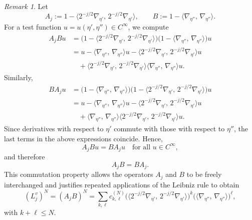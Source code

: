 \documentclass[12pt, reqno]{amsart}
\theoremstyle{definition}
\theoremstyle{remark}
\newtheorem{remark}[theorem]{Remark}
\numberwithin{equation}{section}
\begin{document}
\begin{remark}
Let
\[
A_j := 1 - \langle 2^{-j/2}\nabla_{\eta'},\,2^{-j/2}\nabla_{\eta'}\rangle,
\qquad
B := 1 - \langle\nabla_{\eta''},\,\nabla_{\eta''}\rangle .
\]
For a test function $u=u(\eta',\eta'')\in C^\infty$, we compute
\begin{align*}
A_j B u
&=
\Big(1 - \langle 2^{-j/2}\nabla_{\eta'},\,2^{-j/2}\nabla_{\eta'}\rangle\Big)
\Big(1 - \langle\nabla_{\eta''},\,\nabla_{\eta''}\rangle\Big)u \\
&=
u
- \langle\nabla_{\eta''},\,\nabla_{\eta''}\rangle u
- \langle 2^{-j/2}\nabla_{\eta'},\,2^{-j/2}\nabla_{\eta'}\rangle u \\
&\quad
+ \langle 2^{-j/2}\nabla_{\eta'},\,2^{-j/2}\nabla_{\eta'}\rangle
\langle\nabla_{\eta''},\,\nabla_{\eta''}\rangle u .
\end{align*}
Similarly,
\begin{align*}
B A_j u
&=
\Big(1 - \langle\nabla_{\eta''},\,\nabla_{\eta''}\rangle\Big)
\Big(1 - \langle 2^{-j/2}\nabla_{\eta'},\,2^{-j/2}\nabla_{\eta'}\rangle\Big)u \\
&=
u
- \langle\nabla_{\eta''},\,\nabla_{\eta''}\rangle u
- \langle 2^{-j/2}\nabla_{\eta'},\,2^{-j/2}\nabla_{\eta'}\rangle u \\
&\quad
+ \langle\nabla_{\eta''},\,\nabla_{\eta''}\rangle
\langle 2^{-j/2}\nabla_{\eta'},\,2^{-j/2}\nabla_{\eta'}\rangle u .
\end{align*}
Since derivatives with respect to $\eta'$ commute with those with respect to
$\eta''$, the last terms in the above expressions coincide. Hence,
\[
A_j B u = B A_j u \quad \text{for all } u\in C^\infty,
\]
and therefore
\[
A_j B = B A_j.
\]
This commutation property allows the operators $A_j$ and $B$ to be freely
interchanged and justifies repeated applications of the Leibniz rule to obtain \[
(L_j^v)^N = (A_jB)^N
= \sum_{k,\ell} c_{k,\ell}^{(N)}
\Big(\langle 2^{-j/2}\nabla_{\eta'},\,2^{-j/2}\nabla_{\eta'}\rangle\Big)^k
\Big(\langle\nabla_{\eta''},\,\nabla_{\eta''}\rangle\Big)^\ell,
\]
with $k+\ell \le N$.
\end{remark}
\end{document}
